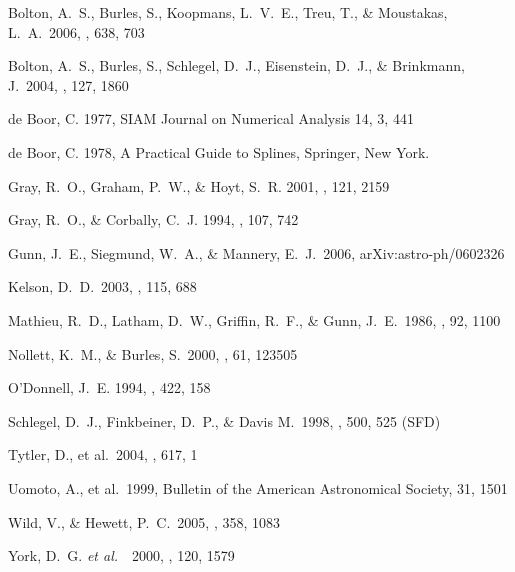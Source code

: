 \documentclass[12pt,preprint]{aastex}
\newcommand{\etal}{{\it et al.}~}
\begin{document}
\newpage




\begin{thebibliography}{DUM}

 Bolton, A.~S., Burles, 
S., Koopmans, L.~V.~E., Treu, T., \& Moustakas, L.~A.\ 2006, \apj, 638, 703 

 Bolton, A.~S., Burles, 
S., Schlegel, D.~J., Eisenstein, D.~J., \& Brinkmann, J.\ 2004, \aj, 127, 
1860 

de Boor, C. 1977,  SIAM Journal on Numerical Analysis 14, 3, 441

de Boor, C. 1978, A Practical Guide to Splines, Springer, New York.

Gray, R.\ O., Graham, P.\ W., \& Hoyt, S.\ R. 2001, \aj, 121, 2159

Gray, R.\ O., \& Corbally, C.\ J. 1994, \aj, 107, 742

 Gunn, J.~E., Siegmund, 
W.~A., \& Mannery, E.~J.\ 2006, arXiv:astro-ph/0602326 

 Kelson, D.~D.\ 2003, \pasp, 
115, 688 

\bibitem[Mathieu \etal\ (1896)]{1986AJ...92...1100} Mathieu, R.~D.,
Latham, D.~W., Griffin, R.~F., \& Gunn, J.~E.\ 1986, \aj, 92, 1100

 Nollett, K.~M., \& 
Burles, S.\ 2000, \prd, 61, 123505 
 
O'Donnell, J.\ E. 1994, \apj, 422, 158

Schlegel, D.\ J., Finkbeiner, D.\ P., \& Davis M.\ 1998, \apj, 500, 525 (SFD)

 Tytler, D., et al.\ 
2004, \apj, 617, 1 

 Uomoto, A., et al.\ 
1999, Bulletin of the American Astronomical Society, 31, 1501 

 Wild, V., \& Hewett, 
P.~C.\ 2005, \mnras, 358, 1083 
  
York, D.\ G. \etal\ 2000, \aj, 120, 1579

\end{thebibliography}
\clearpage
\end{document}
